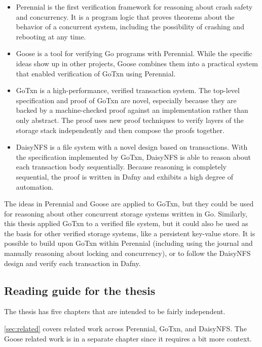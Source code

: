 \begin{itemize}
  \item Perennial is the first verification framework for reasoning about crash
        safety and concurrency. It is a program logic that proves theorems about
        the behavior of a concurrent system, including the possibility of
        crashing and rebooting at any time.
  \item Goose is a tool for verifying Go programs with Perennial. While the
        specific ideas show up in other projects, Goose combines them into a
        practical system that enabled verification of GoTxn using Perennial.
  \item GoTxn is a high-performance, verified transaction system. The
        top-level specification and proof of GoTxn are novel, especially because
        they are backed by a machine-checked proof against an implementation
        rather than only abstract. The proof uses new proof techniques to
        verify layers of the storage stack independently and then compose the
        proofs together.
  \item DaisyNFS is a file system with a novel design based on transactions.
        With the specification implemented by GoTxn, DaisyNFS is able to reason
        about each transaction body sequentially. Because reasoning is
        completely sequential, the proof is written in Dafny and exhibits a high
        degree of automation.
\end{itemize}

The ideas in Perennial and Goose are applied to GoTxn, but they could be used
for reasoning about other concurrent storage systems written in Go. Similarly,
this thesis applied GoTxn to a verified file system, but it could also be used
as the basis for other verified storage systems, like a persistent key-value
store. It is possible to build upon GoTxn within Perennial (including using the
journal and manually reasoning about locking and concurrency), or to follow the
DaisyNFS design and verify each transaction in Dafny.

\subsection{Reading guide for the thesis}

The thesis has five chapters that are intended to be fairly independent.

\autoref{sec:related} covers related work across Perennial, GoTxn, and DaisyNFS.
The Goose related work is in a separate chapter since it requires a bit more
context. 

